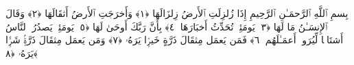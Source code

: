
  
    
  
    
    

\nopagebreak
  بِسمِ ٱللَّهِ ٱلرَّحمَـٰنِ ٱلرَّحِيمِ
  إِذَا زُلزِلَتِ ٱلأَرضُ زِلزَالَهَا ﴿١﴾
 وَأَخرَجَتِ ٱلأَرضُ أَثقَالَهَا ﴿٢﴾
 وَقَالَ ٱلإِنسَـٰنُ مَا لَهَا ﴿٣﴾
 يَومَئِذٍۢ تُحَدِّثُ أَخبَارَهَا ﴿٤﴾
 بِأَنَّ رَبَّكَ أَوحَىٰ لَهَا ﴿٥﴾
 يَومَئِذٍۢ يَصدُرُ ٱلنَّاسُ أَشتَاتًۭا لِّيُرَوا۟ أَعمَـٰلَهُم ﴿٦﴾
 فَمَن يَعمَل مِثقَالَ ذَرَّةٍ خَيرًۭا يَرَهُۥ ﴿٧﴾
 وَمَن يَعمَل مِثقَالَ ذَرَّةٍۢ شَرًّۭا يَرَهُۥ ﴿٨﴾
 
